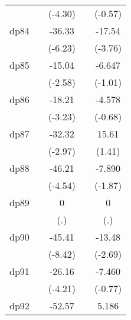 {\begin{tabular}{l*{4}{c}}
            &                     &     (-4.30)         &                     &     (-0.57)         \\
[1em]
dp84        &                     &      -36.33\sym{***}&                     &      -17.54\sym{***}\\
            &                     &     (-6.23)         &                     &     (-3.76)         \\
[1em]
dp85        &                     &      -15.04\sym{**} &                     &      -6.647         \\
            &                     &     (-2.58)         &                     &     (-1.01)         \\
[1em]
dp86        &                     &      -18.21\sym{**} &                     &      -4.578         \\
            &                     &     (-3.23)         &                     &     (-0.68)         \\
[1em]
dp87        &                     &      -32.32\sym{**} &                     &       15.61         \\
            &                     &     (-2.97)         &                     &      (1.41)         \\
[1em]
dp88        &                     &      -46.21\sym{***}&                     &      -7.890         \\
            &                     &     (-4.54)         &                     &     (-1.87)         \\
[1em]
dp89        &                     &           0         &                     &           0         \\
            &                     &         (.)         &                     &         (.)         \\
[1em]
dp90        &                     &      -45.41\sym{***}&                     &      -13.48\sym{**} \\
            &                     &     (-8.42)         &                     &     (-2.69)         \\
[1em]
dp91        &                     &      -26.16\sym{***}&                     &      -7.460         \\
            &                     &     (-4.21)         &                     &     (-0.77)         \\
[1em]
dp92        &                     &      -52.57\sym{***}&                     &       5.186         \\

\end{tabular}}
